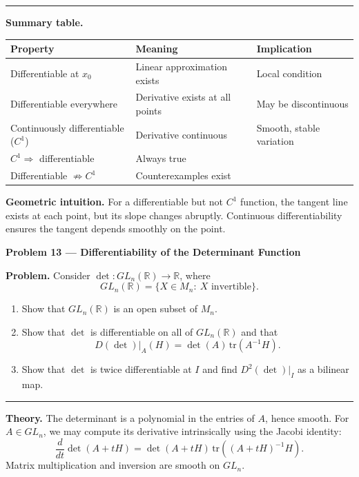 \documentclass[12pt,a4paper]{article}
\theoremstyle{plain}
\theoremstyle{definition}
\theoremstyle{remark}
\theoremstyle{remark}
\newcommand{\probheader}[1]{%
	\par\vspace{8pt}%
	{\Large\bfseries #1\par}%
	\vspace{6pt}%
}
\newcommand{\sep}{\vspace{6pt}\hrule\vspace{8pt}}
\begin{document}
	\sep
	
	\textbf{Summary table.}
	
	\begin{center}
		\begin{tabular}{lll}
			\toprule
			\textbf{Property} & \textbf{Meaning} & \textbf{Implication}\\
			\midrule
			Differentiable at $x_0$ & Linear approximation exists & Local condition \\
			Differentiable everywhere & Derivative exists at all points & May be discontinuous \\
			Continuously differentiable ($C^1$) & Derivative continuous & Smooth, stable variation \\
			$C^1\Rightarrow$ differentiable & Always true & \\
			Differentiable $\not\Rightarrow C^1$ & Counterexamples exist & \\
			\bottomrule
		\end{tabular}
	\end{center}
	
	\textbf{Geometric intuition.}
	For a differentiable but not $C^1$ function, the tangent line exists at each point,
	but its slope changes abruptly.
	Continuous differentiability ensures the tangent depends smoothly on the point.
	
	\probheader{Problem 13 — Differentiability of the Determinant Function}
	
	\textbf{Problem.}
	Consider $\det:GL_n(\mathbb{R})\to\mathbb{R}$, where
	\[
	GL_n(\mathbb{R})=\{X\in M_n:\ X\text{ invertible}\}.
	\]
	\begin{enumerate}[label=(\alph*), leftmargin=1.2cm]
		\item Show that $GL_n(\mathbb{R})$ is an open subset of $M_n$.
		\item Show that $\det$ is differentiable on all of $GL_n(\mathbb{R})$ and that
		\[
		D(\det)|_A(H)=\det(A)\,\mathrm{tr}(A^{-1}H).
		\]
		\item Show that $\det$ is twice differentiable at $I$ and find $D^2(\det)|_I$
		as a bilinear map.
	\end{enumerate}
	
	\sep
	
	\textbf{Theory.}
	The determinant is a polynomial in the entries of $A$, hence smooth.
	For $A\in GL_n$, we may compute its derivative intrinsically using
	the Jacobi identity:
	\[
	\frac{d}{dt}\det(A+tH)=\det(A+tH)\,\mathrm{tr}((A+tH)^{-1}H).
	\]
	Matrix multiplication and inversion are smooth on $GL_n$.
	
\end{document}
